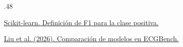 {\begin{frame}[c]
\begin{columns}[T,onlytextwidth]
\begin{column}{.48\textwidth}
{\href{https://scikit-learn.org/stable/modules/generated/sklearn.metrics.f1_score.html}{Scikit-learn. Definición de F1 para la clase positiva.}\par\vspace{2mm}
\href{https://doi.org/10.1038/s41746-026-02551-3}{Liu et al. (2026). Comparación de modelos en ECGBench.}\par}
\end{column}
\end{columns}
\end{frame}}
